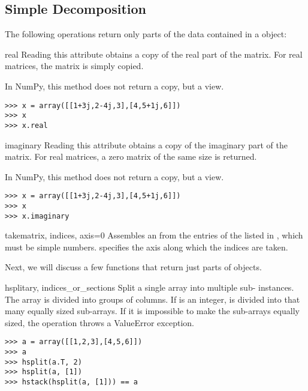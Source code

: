 \subsection{Simple Decomposition}
The following operations return only parts of the data contained in a
 object:

\begin{memberdesc}[Array]{real}
  Reading this attribute obtains a copy of the real part of the matrix.
  For real matrices, the matrix is simply copied.

  In NumPy, this method does not return a copy, but a view.
\begin{verbatim}
>>> x = array([[1+3j,2-4j,3],[4,5+1j,6]])
>>> x
>>> x.real
\end{verbatim}
\end{memberdesc}

\begin{memberdesc}[Array]{imaginary}
  Reading this attribute obtains a copy of the imaginary part of the matrix.
  For real matrices, a zero matrix of the same size is returned.

  In NumPy, this method does not return a copy, but a view.
\begin{verbatim}
>>> x = array([[1+3j,2-4j,3],[4,5+1j,6]])
>>> x
>>> x.imaginary
\end{verbatim}
\end{memberdesc}

\begin{funcdesc}{take}{matrix, indices, axis=0}
  Assembles an  from the entries of the 
  listed in , which must be simple numbers. 
  specifies the axis along which the indices are taken.
\end{funcdesc}

Next, we will discuss a few functions that return just parts of 
objects.

\begin{funcdesc}{hsplit}{ary, indices_or_sections}
  Split a single  array into multiple sub-
  instances.  The array is divided into groups of columns.  If
   is an integer,  is divided into that
  many equally sized sub-arrays.  If it is impossible to make the sub-arrays
  equally sized, the operation throws a ValueError exception. 
  
\begin{verbatim}
>>> a = array([[1,2,3],[4,5,6]])
>>> a
>>> hsplit(a.T, 2)
>>> hsplit(a, [1])
>>> hstack(hsplit(a, [1])) == a
\end{verbatim}
\end{funcdesc}

